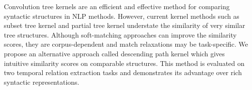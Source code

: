 Convolution tree kernels are an efficient and effective method for comparing syntactic structures in NLP methods. However, current kernel methods such as subset tree kernel and partial tree kernel understate the similarity of very similar tree structures. Although soft-matching approaches can improve the similarity scores, they are corpus-dependent and match relaxations may be task-specific. We propose an alternative approach called descending path kernel which gives intuitive similarity scores on comparable structures. This method is evaluated on two temporal relation extraction tasks and demonstrates its advantage over rich syntactic representations.
